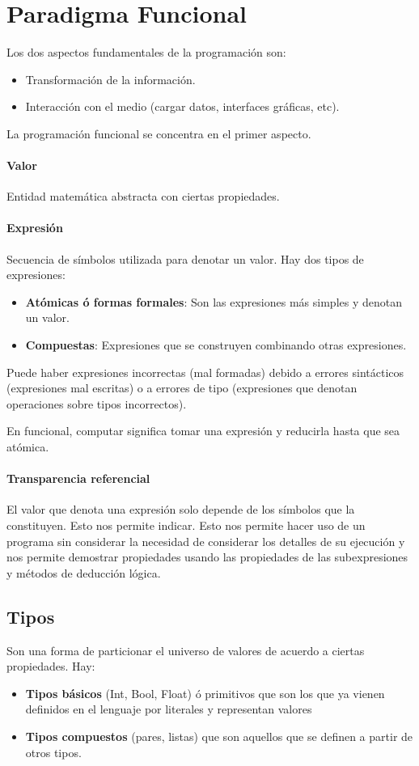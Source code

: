 \section{Paradigma Funcional}
Los dos aspectos fundamentales de la programación son:
\begin{itemize}
	\item Transformación de la información.
	\item Interacción con el medio (cargar datos, interfaces gráficas, etc).
\end{itemize}
La programación funcional se concentra en el primer aspecto.

\paragraph{Valor} Entidad matemática abstracta con ciertas propiedades.

\paragraph{Expresión} Secuencia de símbolos utilizada para denotar un valor. Hay dos tipos de expresiones:
\begin{itemize}
	\item \textbf{Atómicas ó formas formales}: Son las expresiones más simples y denotan un valor.
	\item \textbf{Compuestas}: Expresiones que se construyen combinando otras expresiones.
\end{itemize}

Puede haber expresiones incorrectas (mal formadas) debido a errores sintácticos (expresiones mal escritas) o a errores de tipo (expresiones que denotan operaciones sobre tipos incorrectos).

En funcional, computar significa tomar una expresión y reducirla hasta que sea atómica.

\paragraph{Transparencia referencial} El valor que denota una expresión solo depende de los símbolos que la constituyen. Esto nos permite indicar. Esto nos permite hacer uso de un programa sin considerar la necesidad de considerar los detalles de su ejecución y nos permite demostrar propiedades usando las propiedades de las subexpresiones y métodos  de deducción lógica.

\subsection{Tipos}
Son una forma de particionar el universo de valores de acuerdo a ciertas propiedades. Hay:
\begin{itemize}
	\item \textbf{Tipos básicos} (Int, Bool, Float) ó primitivos que son los que ya vienen definidos en el lenguaje por literales y representan valores 
	\item \textbf{Tipos compuestos} (pares, listas) que son aquellos que se definen a partir de otros tipos.
\end{itemize}

